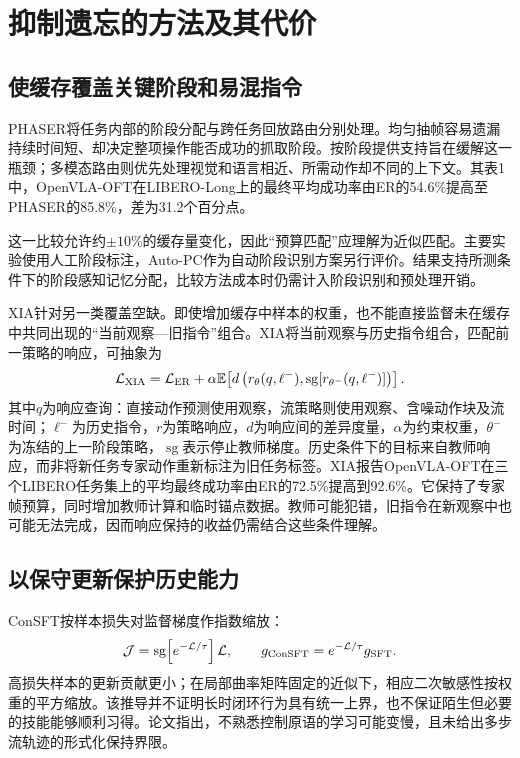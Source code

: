 \documentclass[UTF8,11pt,a4paper,fontset=fandol]{ctexart}
\begin{document}
\section{抑制遗忘的方法及其代价}
\subsection{使缓存覆盖关键阶段和易混指令}
PHASER将任务内部的阶段分配与跨任务回放路由分别处理\cite{phaser}。均匀抽帧容易遗漏持续时间短、却决定整项操作能否成功的抓取阶段。按阶段提供支持旨在缓解这一瓶颈；多模态路由则优先处理视觉和语言相近、所需动作却不同的上下文。其表1中，OpenVLA-OFT在LIBERO-Long上的最终平均成功率由ER的54.6\%提高至PHASER的85.8\%，差为31.2个百分点。

这一比较允许约$\pm10$\%的缓存量变化，因此“预算匹配”应理解为近似匹配。主要实验使用人工阶段标注，Auto-PC作为自动阶段识别方案另行评价。结果支持所测条件下的阶段感知记忆分配，比较方法成本时仍需计入阶段识别和预处理开销。

XIA针对另一类覆盖空缺\cite{xia}。即使增加缓存中样本的权重，也不能直接监督未在缓存中共同出现的“当前观察—旧指令”组合。XIA将当前观察与历史指令组合，匹配前一策略的响应，可抽象为
\begin{equation}
\mathcal L_{\rm XIA}=\mathcal L_{\rm ER}+\alpha\mathbb E\!\left[
d\left(r_\theta(q,\ell^-),\operatorname{sg}[r_{\theta^-}(q,\ell^-)]\right)\right].
\end{equation}
其中$q$为响应查询：直接动作预测使用观察，流策略则使用观察、含噪动作块及流时间；$\ell^-$为历史指令，$r$为策略响应，$d$为响应间的差异度量，$\alpha$为约束权重，$\theta^-$为冻结的上一阶段策略，$\operatorname{sg}$表示停止教师梯度。历史条件下的目标来自教师响应，而非将新任务专家动作重新标注为旧任务标签。XIA报告OpenVLA-OFT在三个LIBERO任务集上的平均最终成功率由ER的72.5\%提高到92.6\%。它保持了专家帧预算，同时增加教师计算和临时锚点数据。教师可能犯错，旧指令在新观察中也可能无法完成，因而响应保持的收益仍需结合这些条件理解。

\subsection{以保守更新保护历史能力}
ConSFT按样本损失对监督梯度作指数缩放\cite{consft}：
\begin{equation}
\mathcal J=\operatorname{sg}\!\left[e^{-\mathcal L/\tau}\right]\mathcal L,
\qquad g_{\rm ConSFT}=e^{-\mathcal L/\tau}g_{\rm SFT}.
\end{equation}
高损失样本的更新贡献更小；在局部曲率矩阵固定的近似下，相应二次敏感性按权重的平方缩放。该推导并不证明长时闭环行为具有统一上界，也不保证陌生但必要的技能能够顺利习得。论文指出，不熟悉控制原语的学习可能变慢，且未给出多步流轨迹的形式化保持界限。
\end{document}
